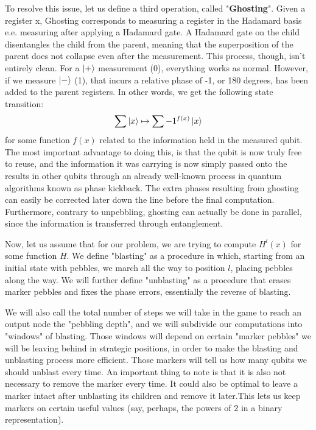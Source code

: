 To resolve this issue, let us define a third operation, called "\textbf{Ghosting}". Given a register x, Ghosting corresponds to measuring a register in the Hadamard basis e.e. measuring after applying a Hadamard gate. A Hadamard gate on the child disentangles the child from the parent, meaning that the superposition of the parent does not collapse even after the measurement. This process, though, isn't entirely clean. For a $\ket{+}$ measurement (0), everything works as normal. However, if we measure $\ket{-}$ (1), that incurs a relative phase of -1, or 180 degrees, has been added to the parent registers. In other words, we get the following state transition:
\begin{equation}
    \sum \ket{x} \mapsto \sum -1^{f(x)} \ket{x}
\end{equation}
for some function $f(x)$ related to the information held in the measured qubit.
The most important advantage to doing this, is that the qubit is now truly free to reuse, and the information it was carrying is now simply passed onto the results in other qubits through an already well-known process in quantum algorithms known as phase kickback. The extra phases resulting from ghosting can easily be corrected later down the line before the final computation. Furthermore, contrary to unpebbling, ghosting can actually be done in parallel, since the information is transferred through entanglement. 

Now, let us assume that for our problem, we are trying to compute $H^l(x)$ for some function $H$. We define "blasting" as a procedure in which, starting from an initial state with pebbles, we march all the way to position $l$, placing pebbles along the way. We will further define "unblasting" as a procedure that erases marker pebbles and fixes the phase errors, essentially the reverse of blasting.

We will also call the total number of steps we will take in the game to reach an output node the "pebbling depth", and we will subdivide our computations into "windows" of blasting. Those windows will depend on certain "marker pebbles" we will be leaving behind in strategic positions, in order to make the blasting and unblasting process more efficient. Those markers will tell us how many qubits we should unblast every time. An important thing to note is that it is also not necessary to remove the marker every time. It could also be optimal to leave a marker intact after unblasting its children and remove it later.This lets us keep markers on certain useful values (say, perhaps, the powers of 2 in a binary representation).


